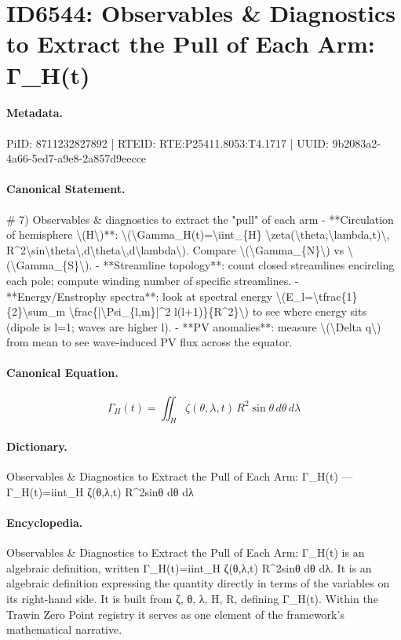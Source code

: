 \section*{ID6544: Observables \& Diagnostics to Extract the Pull of Each Arm: Γ\_H(t)}
\paragraph{Metadata.}
PiID: 8711232827892 | RTEID: RTE:P25411.8053:T4.1717 | UUID: 9b2083a2-4a66-5ed7-a9e8-2a857d9eecce

\paragraph{Canonical Statement.}
\# 7) Observables \& diagnostics to extract the "pull" of each arm - **Circulation of hemisphere \textbackslash{}(H\textbackslash{})**: \textbackslash{}(\textbackslash{}Gamma\_H(t)=\textbackslash{}iint\_\{H\} \textbackslash{}zeta(\textbackslash{}theta,\textbackslash{}lambda,t)\textbackslash{}, R\textasciicircum{}2\textbackslash{}sin\textbackslash{}theta\textbackslash{},d\textbackslash{}theta\textbackslash{},d\textbackslash{}lambda\textbackslash{}). Compare \textbackslash{}(\textbackslash{}Gamma\_\{N\}\textbackslash{}) vs \textbackslash{}(\textbackslash{}Gamma\_\{S\}\textbackslash{}). - **Streamline topology**: count closed streamlines encircling each pole; compute winding number of specific streamlines. - **Energy/Enstrophy spectra**: look at spectral energy \textbackslash{}(E\_l=\textbackslash{}tfrac\{1\}\{2\}\textbackslash{}sum\_m \textbackslash{}frac\{|\textbackslash{}Psi\_\{l,m\}|\textasciicircum{}2 l(l+1)\}\{R\textasciicircum{}2\}\textbackslash{}) to see where energy sits (dipole is l=1; waves are higher l). - **PV anomalies**: measure \textbackslash{}(\textbackslash{}Delta q\textbackslash{}) from mean to see wave-induced PV flux across the equator.

\paragraph{Canonical Equation.}
\[
\Gamma_H(t)=\iint_{H} \zeta(\theta,\lambda,t)\, R^2\sin\theta\,d\theta\,d\lambda
\]

\paragraph{Dictionary.}
Observables \& Diagnostics to Extract the Pull of Each Arm: Γ\_H(t) — Γ\_H(t)=iint\_H ζ(θ,λ,t) R\textasciicircum{}2sinθ dθ dλ

\paragraph{Encyclopedia.}
Observables \& Diagnostics to Extract the Pull of Each Arm: Γ\_H(t) is an algebraic definition, written Γ\_H(t)=iint\_H ζ(θ,λ,t) R\textasciicircum{}2sinθ dθ dλ. It is an algebraic definition expressing the quantity directly in terms of the variables on its right-hand side. It is built from ζ, θ, λ, H, R, defining Γ\_H(t). Within the Trawin Zero Point registry it serves as one element of the framework's mathematical narrative.
